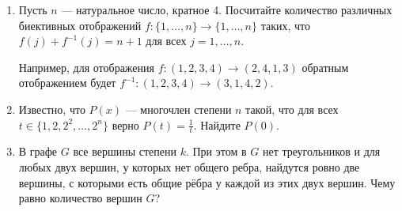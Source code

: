 \documentclass[14pt, a5paper]{extarticle}
\begin{document}
\begin{enumerate}
\item Пусть $n$ --- натуральное число, кратное 4. Посчитайте количество различных биективных отображений $f: \{1, \hdots, n\} \rightarrow \{1, \hdots, n\}$ таких, что $f(j) + f^{-1}(j) = n + 1$ для всех $j = 1, \hdots, n$. 

Например, для отображения $f: (1, 2, 3, 4) \rightarrow (2, 4, 1, 3)$ обратным отображением будет $f^{-1}: (1,2,3,4) \rightarrow (3, 1, 4, 2)$.

\item Известно, что $P(x)$ --- многочлен степени $n$ такой, что для всех $t \in \{ 1, 2, 2^2, \hdots, 2^n \}$ верно $P(t) = \frac{1}{t}$. Найдите $P(0)$.

\item В графе $G$ все вершины степени $k$. При этом в $G$ нет треугольников и для любых двух вершин, у которых нет общего ребра, найдутся ровно две вершины, с которыми есть общие рёбра у каждой из этих двух вершин. Чему равно количество вершин $G$?

\end{enumerate}
\end{document}

